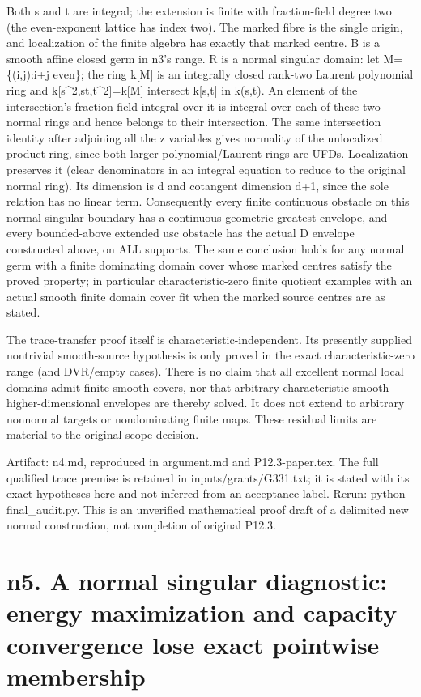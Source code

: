 \documentclass[11pt]{article}
\begin{document}
Both s and t are integral; the extension is finite with fraction-field degree two (the even-exponent lattice has index two). The marked fibre is the single origin, and localization of the finite algebra has exactly that marked centre. B is a smooth affine closed germ in n3's range. R is a normal singular domain: let M=\{(i,j):i+j even\}; the ring k[M] is an integrally closed rank-two Laurent polynomial ring and k[s\textasciicircum{}2,st,t\textasciicircum{}2]=k[M] intersect k[s,t] in k(s,t). An element of the intersection's fraction field integral over it is integral over each of these two normal rings and hence belongs to their intersection. The same intersection identity after adjoining all the z variables gives normality of the unlocalized product ring, since both larger polynomial/Laurent rings are UFDs. Localization preserves it (clear denominators in an integral equation to reduce to the original normal ring). Its dimension is d and cotangent dimension d+1, since the sole relation has no linear term. Consequently every finite continuous obstacle on this normal singular boundary has a continuous geometric greatest envelope, and every bounded-above extended usc obstacle has the actual D envelope constructed above, on ALL supports. The same conclusion holds for any normal germ with a finite dominating domain cover whose marked centres satisfy the proved property; in particular characteristic-zero finite quotient examples with an actual smooth finite domain cover fit when the marked source centres are as stated.

The trace-transfer proof itself is characteristic-independent. Its presently supplied nontrivial smooth-source hypothesis is only proved in the exact characteristic-zero range (and DVR/empty cases). There is no claim that all excellent normal local domains admit finite smooth covers, nor that arbitrary-characteristic smooth higher-dimensional envelopes are thereby solved. It does not extend to arbitrary nonnormal targets or nondominating finite maps. These residual limits are material to the original-scope decision.

Artifact: n4.md, reproduced in argument.md and P12.3-paper.tex. The full qualified trace premise is retained in inputs/grants/G331.txt; it is stated with its exact hypotheses here and not inferred from an acceptance label. Rerun: python final\_audit.py. This is an unverified mathematical proof draft of a delimited new normal construction, not completion of original P12.3.

\section{n5. A normal singular diagnostic: energy maximization and capacity convergence lose exact pointwise membership}
\end{document}

